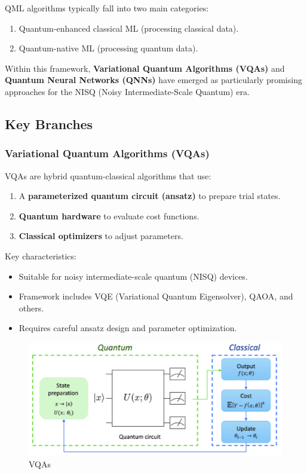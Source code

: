 \documentclass[a4paper]{article}
\begin{document}
QML algorithms typically fall into two main categories:
\begin{enumerate}
    \item Quantum-enhanced classical ML (processing classical data).
    \item Quantum-native ML (processing quantum data).
\end{enumerate}
Within this framework, \textbf{Variational Quantum Algorithms (VQAs)} and \textbf{Quantum Neural Networks (QNNs)} have emerged as particularly promising approaches for the NISQ (Noisy Intermediate-Scale Quantum) era.

\subsection{Key Branches}
\subsubsection{Variational Quantum Algorithms (VQAs)}
VQAs are hybrid quantum-classical algorithms that use:
\begin{enumerate}
    \item A \textbf{parameterized quantum circuit (ansatz)} to prepare trial states.
    \item \textbf{Quantum hardware} to evaluate cost functions.
    \item \textbf{Classical optimizers} to adjust parameters.
\end{enumerate}

Key characteristics:
\begin{itemize}
    \item Suitable for noisy intermediate-scale quantum (NISQ) devices.
    \item Framework includes VQE (Variational Quantum Eigensolver), QAOA, and others.
    \item Requires careful ansatz design and parameter optimization.
\end{itemize}

\begin{figure}[htbp]
    \centering
    \includegraphics[width=0.5\linewidth]{images/qml.png}
    \caption{VQAs}
    \label{2}
\end{figure}
\end{document}

